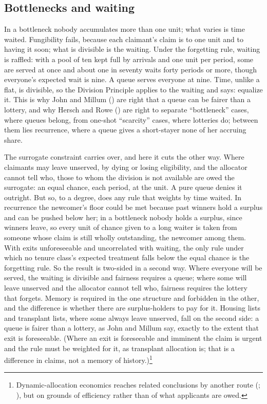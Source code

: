 \documentclass[
  11pt,
  letterpaper,
  DIV=11,
  numbers=noendperiod,
  twoside]{scrartcl}
\newcounter{none} %
\begin{document}
\subsection{Bottlenecks and waiting}\label{sec-bottleneck}

In a bottleneck nobody accumulates more than one unit; what varies is
time waited. Fungibility fails, because each claimant's claim is to one
unit and to having it soon; what is divisible is the waiting. Under the
forgetting rule, waiting is raffled: with a pool of ten kept full by
arrivals and one unit per period, some are served at once and about one
in seventy waits forty periods or more, though everyone's expected wait
is nine. A queue serves everyone at nine. Time, unlike a flat, is
divisible, so the Division Principle applies to the waiting and says:
equalize it. This is why John and Millum
() are right that a queue can be
fairer than a lottery, and why Hersch and Rowe
() are right to separate
``bottleneck'' cases, where queues belong, from one-shot ``scarcity''
cases, where lotteries do; between them lies recurrence, where a queue
gives a short-stayer none of her accruing share.

The surrogate constraint carries over, and here it cuts the other way.
Where claimants may leave unserved, by dying or losing eligibility, and
the allocator cannot tell who, those to whom the division is not
available are owed the surrogate: an equal chance, each period, at the
unit. A pure queue denies it outright. But so, to a degree, does any
rule that weights by time waited. In recurrence the newcomer's floor
could be met because past winners hold a surplus and can be pushed below
her; in a bottleneck nobody holds a surplus, since winners leave, so
every unit of chance given to a long waiter is taken from someone whose
claim is still wholly outstanding, the newcomer among them. With exits
unforeseeable and uncorrelated with waiting, the only rule under which
no tenure class's expected treatment falls below the equal chance is the
forgetting rule. So the result is two-sided in a second way. Where
everyone will be served, the waiting is divisible and fairness requires
a queue; where some will leave unserved and the allocator cannot tell
who, fairness requires the lottery that forgets. Memory is required in
the one structure and forbidden in the other, and the difference is
whether there are surplus-holders to pay for it. Housing lists and
transplant lists, where some always leave unserved, fall on the second
side: a queue is fairer than a lottery, as John and Millum say, exactly
to the extent that exit is foreseeable. (Where an exit is foreseeable
and imminent the claim is urgent and the rule must be weighted for it,
as transplant allocation is; that is a difference in claims, not a
memory of history.)\footnote{Dynamic-allocation economics reaches
  related conclusions by another route (; ), but on
  grounds of efficiency rather than of what applicants are owed.}
\end{document}

